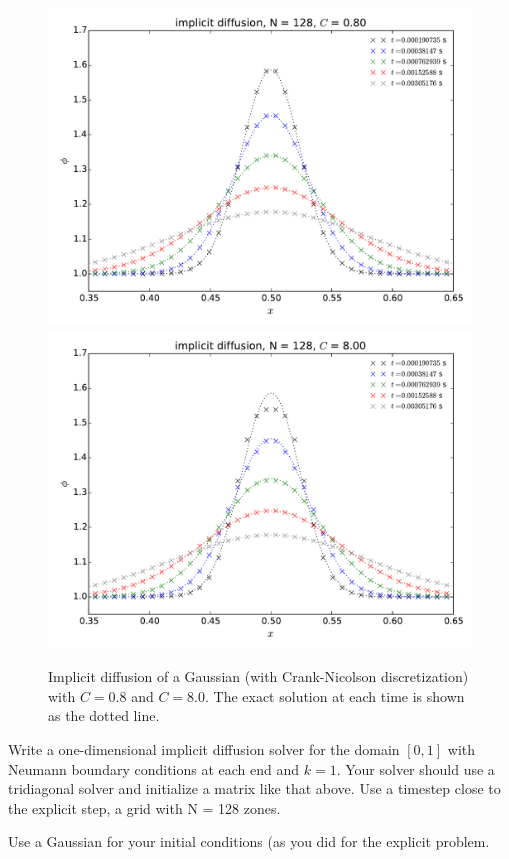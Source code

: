\begin{figure}[t]
\centering
\includegraphics[width=0.85\linewidth]{diff-implicit-128-CFL_0_8}\\
\includegraphics[width=0.85\linewidth]{diff-implicit-128-CFL_8_0}
\caption[Implicit diffusion of a Gaussian]{\label{fig:diffuse}
  Implicit diffusion of a Gaussian (with Crank-Nicolson
  discretization) with $C = 0.8$ and $C = 8.0$.  The exact solution at
  each time is shown as the dotted
  line. \\ }
\end{figure}

\begin{exercise}
{Write a one-dimensional implicit diffusion solver for the
  domain $[0,1]$ with Neumann boundary conditions at each end and $k = 1$.
  Your solver should use a tridiagonal solver and initialize a matrix like
  that above.  Use a timestep close to the explicit step, a grid with
  N = 128 zones.

  Use a Gaussian for your initial conditions (as you did for the 
  explicit problem.}
\end{exercise}


